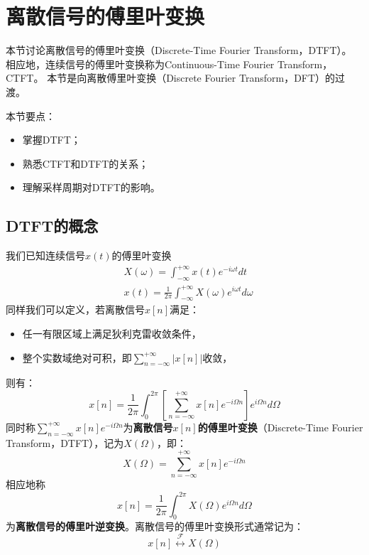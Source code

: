 \section{离散信号的傅里叶变换}

本节讨论离散信号的傅里叶变换（Discrete-Time Fourier Transform，DTFT）。
相应地，连续信号的傅里叶变换称为Continuous-Time Fourier Transform，CTFT。
本节是向离散傅里叶变换（Discrete Fourier Transform，DFT）的过渡。

本节要点：
\begin{itemize}
    \item 掌握DTFT；
    \item 熟悉CTFT和DTFT的关系；
    \item 理解采样周期对DTFT的影响。
\end{itemize}

\subsection{DTFT的概念}

\begin{definition}[离散信号的傅里叶变换]
我们已知连续信号$x\left( t \right) $的傅里叶变换
\begin{align*}
&X\left( \omega \right) =\int_{-\infty}^{+\infty}{x\left( t \right) e^{-i\omega t}dt} \\
&x\left( t \right) =\frac{1}{2\pi}\int_{-\infty}^{+\infty}{X\left( \omega \right) e^{i\omega t}d\omega}
\end{align*}
同样我们可以定义，若离散信号$x\left[ n \right] $满足：
\begin{itemize}
    \item 任一有限区域上满足狄利克雷收敛条件，
    \item 整个实数域绝对可积，即$\sum_{n=-\infty}^{+\infty}{\left| x\left[ n \right] \right|}$收敛，
\end{itemize}
则有：
\[
x\left[ n \right] =\frac{1}{2\pi}\int_0^{2\pi}{\left[ \sum_{n=-\infty}^{+\infty}{x\left[ n \right] e^{-i\varOmega n}} \right] e^{i\varOmega n}d\varOmega}
\]
同时称$\sum_{n=-\infty}^{+\infty}{x\left[ n \right] e^{-i\varOmega n}}$为{\bf 离散信号$x\left[ n \right] $的傅里叶变换}（Discrete-Time Fourier Transform，DTFT），记为$X\left( \varOmega \right) $，即：
\[
X\left( \varOmega \right) =\sum_{n=-\infty}^{+\infty}{x\left[ n \right] e^{-i\varOmega n}}
\]
相应地称
\[
x\left[ n \right] =\frac{1}{2\pi}\int_0^{2\pi}{X\left( \varOmega \right) e^{i\varOmega n}d\varOmega}
\]
为{\bf 离散信号的傅里叶逆变换}。离散信号的傅里叶变换形式通常记为：
\[
x\left[ n \right] \overset{\mathscr{F}}{\leftrightarrow}X\left( \varOmega \right)
\]
\end{definition}

